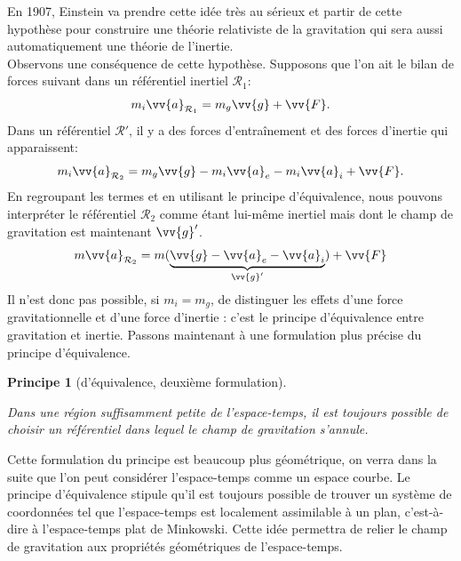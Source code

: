 \documentclass[a4paper,11pt]{report}
\theoremstyle{definition}
\theoremstyle{plain}
\newtheorem{prin}[thm]{Principe}
\theoremstyle{definition}
\theoremstyle{remark}
\newcommand{\R}{\mathcal{R}}
\begin{document}
            En 1907, Einstein va prendre cette idée très au sérieux et partir de cette hypothèse pour construire une théorie relativiste de la gravitation qui sera aussi automatiquement une théorie de l'inertie.\\
            
            Observons une conséquence de cette hypothèse. Supposons que l'on ait le bilan de forces suivant dans un référentiel inertiel $\R_1$:
            \begin{equation}
                m_i\vv{a}_{\R_1} = m_g\vv{g} + \vv{F}.
            \end{equation}
            Dans un référentiel $\R'$, il y a des forces d'entraînement et des forces d'inertie qui apparaissent:
            \begin{equation}
                m_i\vv{a}_{\R_2} = m_g\vv{g} -m_i\vv{a}_e-m_i\vv{a}_i + \vv{F}.
            \end{equation}
            En regroupant les termes et en utilisant le principe d'équivalence, nous pouvons interpréter le référentiel $\R_2$ comme étant lui-même inertiel mais dont le champ de gravitation est maintenant $\vv{g}'$.
            \begin{equation}
                m\vv{a}_{\R_2} = m(\underbrace{\vv{g} -\vv{a}_e-\vv{a}_i}_{\vv{g}'}) + \vv{F}
            \end{equation}
            Il n'est donc pas possible, si $m_i=m_g$, de distinguer les effets d'une force gravitationnelle et d'une force d'inertie : c'est le principe d'équivalence entre gravitation et inertie. Passons maintenant à une formulation plus précise du principe d'équivalence.
            
            \begin{prin}[d'équivalence, deuxième formulation]
            \begin{leftbar}
                Dans une région suffisamment petite de l'espace-temps, il est toujours possible de choisir un référentiel dans lequel le champ de gravitation s'annule.
            \end{leftbar}
            \end{prin}
        
            Cette formulation du principe est beaucoup plus géométrique, on verra dans la suite que l'on peut considérer l'espace-temps comme un espace courbe. Le principe d'équivalence stipule qu'il est toujours possible de trouver un système de coordonnées tel que l'espace-temps est localement assimilable à un plan, c'est-à-dire à l'espace-temps plat de Minkowski. Cette idée permettra de relier le champ de gravitation aux propriétés géométriques de l'espace-temps.
        
\end{document}
